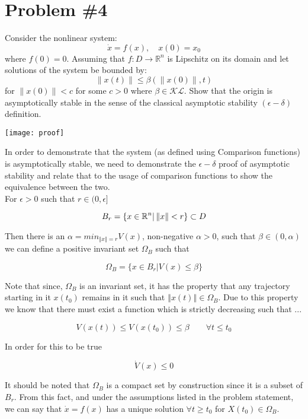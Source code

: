 \section*{Problem \#4}


Consider the nonlinear system:
$$
\dot{x}=f(x), \quad x(0)=x_{0}
$$
where $f(0)=0 .$ Assuming that $f: D \rightarrow \mathbb{R}^{n}$ is Lipschitz on its domain and let solutions of the system be bounded by:
$$
\|x(t)\| \leq \beta(\|x(0)\|, t)
$$
for $\|x(0)\|<c$ for some $c>0$ where $\beta \in \mathcal{K} \mathcal{L} .$ Show that the origin is asymptotically stable in the sense of the classical asymptotic stability $(\epsilon-\delta)$ definition.



\begin{center}
  \texttt{[image: proof]}
\end{center}

\noindent In order to demonstrate that the system (as defined using Comparison functions) is asymptotically stable, we need to demonstrate the $\epsilon - \delta$ proof of asymptotic stability and relate that to the usage of comparison functions to show the equivalence between the two. \\

\noindent For $\epsilon >0$ such that $r \in (0, \epsilon]$

$$
B_r = \{ x\in \mathbb{R}^n | \left\Vert x \right\Vert < r\} \subset D
$$

\noindent Then there is an $\alpha = min_{\left\Vert x \right\Vert = r} V(x)$, non-negative $\alpha >0$, such that $\beta \in (0, \alpha)$ we can define a positive invariant set $\Omega_B$ such that


$$
\Omega_B = \{ x \in B_r | V(x) \leq \beta\}
$$

\noindent Note that since, $\Omega_B$ is an invariant set, it has the property that any trajectory starting in it $x(t_0)$ remains in it such that $\left\Vert x(t) \right\Vert \in \Omega_B$. Due to this property we know that there must exist a function which is strictly decreasing such that ...


$$
V(x(t)) \leq V(x(t_0)) \leq \beta \quad \quad \forall t \leq t_0
$$

\noindent In order for this to be true

$$
\dot{V}(x) \leq 0
$$

\noindent It should be noted that $\Omega_B$ is a compact set by construction since it is a subset of $B_r$. From this fact, and under the assumptions listed in the problem statement, we can say that $\dot{x} = f(x)$ has a unique solution $\forall t \geq t_0$ for $X(t_0) \in \Omega_B$.\\

